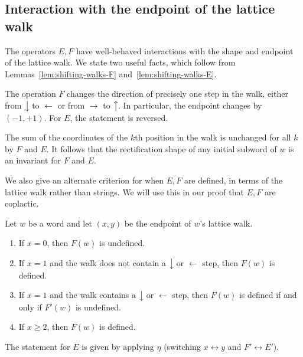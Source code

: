 \documentclass[ALCO,ThmDefs,Unicode,epreuves]{cedram}
\newcommand{\east}[1]{\ensuremath{\xrightarrow{\ #1\ }}}
\newcommand{\west}[1]{\ensuremath{\xleftarrow{\ #1\ }}}
\newcommand{\north}[1]{\ensuremath{\big \uparrow \!\text{\raisebox{.1ex}{\scriptsize $#1$}}}}
\newcommand{\south}[1]{\ensuremath{\big \downarrow \!\text{\raisebox{.1ex}{\scriptsize $#1$}}}}
\begin{document}
\subsection{Interaction with the endpoint of the lattice walk}

The operators $E,F$ have well-behaved interactions with the shape and endpoint of the lattice walk. We state two useful facts, which follow from Lemmas~\ref{lem:shifting-walks-F} and~\ref{lem:shifting-walks-E}.

\begin{coro}\label{cor:F-on-walk}
The operation $F$ changes the direction of precisely one step in the walk, either from $\south{}$ to $\west{~~}$ or from $\east{~~}$ to $\north{}$. In particular, the endpoint changes by $(-1,+1)$. For $E$, the statement is reversed.
\end{coro}

\begin{coro}
\label{cor:initial-subwords-dual}
The sum of the coordinates of the $k$th position in the walk is unchanged for all $k$ by $F$ and $E$. It follows that the rectification shape of any initial subword of $w$ is an invariant for $F$ and $E$.
\end{coro}

We also give an alternate criterion for when $E,F$ are defined, in terms of the lattice walk rather than strings. We will use this in our proof that $E,F$ are coplactic.

\begin{prop}
\label{prop:alternate-definedness}
Let $w$ be a word and let $(x,y)$ be the endpoint of $w$'s lattice walk.
\begin{enumerate}[label={(\roman*)}]
\item\label{prop5.16_i} %
If $x=0$, then $F(w)$ is undefined.
\item\label{prop5.16_ii} %
If $x = 1$ and the walk does not contain a $\south{}$ or $\west{}$ step, then $F(w)$ is defined.
\item\label{prop5.16_iii} %
If $x=1$ and the walk contains a $\south{}$ or $\west{}$ step, then $F(w)$ is defined if and only if $F'(w)$ is undefined.
\item\label{prop5.16_iv} %
If $x \geq 2$, then $F(w)$ is defined.
\end{enumerate}
The statement for $E$ is given by applying $\eta$ 
\textup{(}switching $x \leftrightarrow y$ and $F' \leftrightarrow E'$\textup{)}.
\end{prop}
\end{document}
